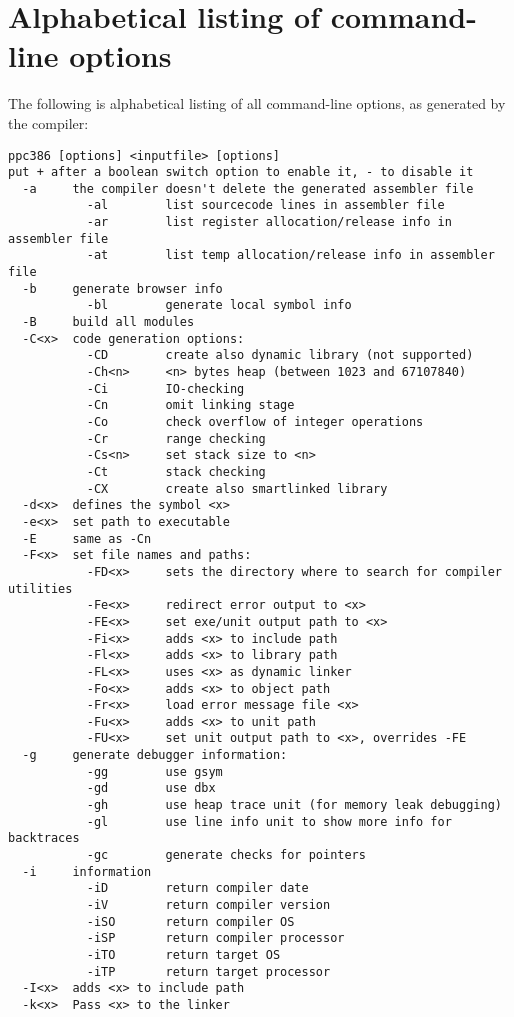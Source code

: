 \documentclass{report}
\begin{document}
\chapter{Alphabetical listing of command-line options}
The following is alphabetical listing of all command-line options, as
generated by the compiler:
\begin{verbatim}
ppc386 [options] <inputfile> [options]
put + after a boolean switch option to enable it, - to disable it
  -a     the compiler doesn't delete the generated assembler file
           -al        list sourcecode lines in assembler file
           -ar        list register allocation/release info in assembler file
           -at        list temp allocation/release info in assembler file
  -b     generate browser info
           -bl        generate local symbol info
  -B     build all modules
  -C<x>  code generation options:
           -CD        create also dynamic library (not supported)
           -Ch<n>     <n> bytes heap (between 1023 and 67107840)
           -Ci        IO-checking
           -Cn        omit linking stage
           -Co        check overflow of integer operations
           -Cr        range checking
           -Cs<n>     set stack size to <n>
           -Ct        stack checking
           -CX        create also smartlinked library
  -d<x>  defines the symbol <x>
  -e<x>  set path to executable
  -E     same as -Cn
  -F<x>  set file names and paths:
           -FD<x>     sets the directory where to search for compiler utilities
           -Fe<x>     redirect error output to <x>
           -FE<x>     set exe/unit output path to <x>
           -Fi<x>     adds <x> to include path
           -Fl<x>     adds <x> to library path
           -FL<x>     uses <x> as dynamic linker
           -Fo<x>     adds <x> to object path
           -Fr<x>     load error message file <x>
           -Fu<x>     adds <x> to unit path
           -FU<x>     set unit output path to <x>, overrides -FE
  -g     generate debugger information:
           -gg        use gsym
           -gd        use dbx
           -gh        use heap trace unit (for memory leak debugging)
           -gl        use line info unit to show more info for backtraces
           -gc        generate checks for pointers
  -i     information
           -iD        return compiler date
           -iV        return compiler version
           -iSO       return compiler OS
           -iSP       return compiler processor
           -iTO       return target OS
           -iTP       return target processor
  -I<x>  adds <x> to include path
  -k<x>  Pass <x> to the linker

\end{verbatim}
\end{document}
